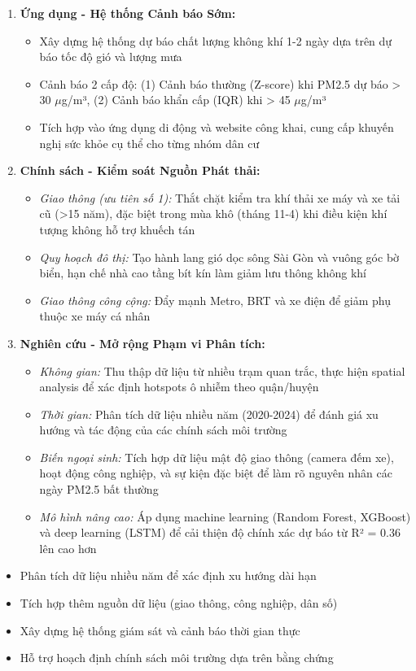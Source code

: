 \documentclass[12pt,a4paper]{article}
\begin{document}
\begin{enumerate}
    \item \textbf{Ứng dụng - Hệ thống Cảnh báo Sớm:}
    \begin{itemize}
        \item Xây dựng hệ thống dự báo chất lượng không khí 1-2 ngày dựa trên dự báo tốc độ gió và lượng mưa
        \item Cảnh báo 2 cấp độ: (1) Cảnh báo thường (Z-score) khi PM2.5 dự báo > 30 $\mu$g/m³, (2) Cảnh báo khẩn cấp (IQR) khi > 45 $\mu$g/m³
        \item Tích hợp vào ứng dụng di động và website công khai, cung cấp khuyến nghị sức khỏe cụ thể cho từng nhóm dân cư
    \end{itemize}
    
    \item \textbf{Chính sách - Kiểm soát Nguồn Phát thải:}
    \begin{itemize}
        \item \textit{Giao thông (ưu tiên số 1):} Thắt chặt kiểm tra khí thải xe máy và xe tải cũ (>15 năm), đặc biệt trong mùa khô (tháng 11-4) khi điều kiện khí tượng không hỗ trợ khuếch tán
        \item \textit{Quy hoạch đô thị:} Tạo hành lang gió dọc sông Sài Gòn và vuông góc bờ biển, hạn chế nhà cao tầng bít kín làm giảm lưu thông không khí
        \item \textit{Giao thông công cộng:} Đẩy mạnh Metro, BRT và xe điện để giảm phụ thuộc xe máy cá nhân
    \end{itemize}
    
    \item \textbf{Nghiên cứu - Mở rộng Phạm vi Phân tích:}
    \begin{itemize}
        \item \textit{Không gian:} Thu thập dữ liệu từ nhiều trạm quan trắc, thực hiện spatial analysis để xác định hotspots ô nhiễm theo quận/huyện
        \item \textit{Thời gian:} Phân tích dữ liệu nhiều năm (2020-2024) để đánh giá xu hướng và tác động của các chính sách môi trường
        \item \textit{Biến ngoại sinh:} Tích hợp dữ liệu mật độ giao thông (camera đếm xe), hoạt động công nghiệp, và sự kiện đặc biệt để làm rõ nguyên nhân các ngày PM2.5 bất thường
        \item \textit{Mô hình nâng cao:} Áp dụng machine learning (Random Forest, XGBoost) và deep learning (LSTM) để cải thiện độ chính xác dự báo từ R² = 0.36 lên cao hơn
    \end{itemize}
\end{enumerate}
\begin{itemize}
    \item Phân tích dữ liệu nhiều năm để xác định xu hướng dài hạn
    \item Tích hợp thêm nguồn dữ liệu (giao thông, công nghiệp, dân số)
    \item Xây dựng hệ thống giám sát và cảnh báo thời gian thực
    \item Hỗ trợ hoạch định chính sách môi trường dựa trên bằng chứng
\end{itemize}
\end{document}
